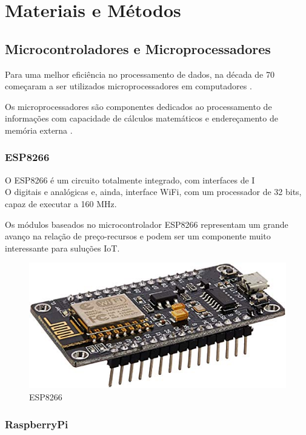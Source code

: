 \chapter{Materiais e Métodos}

\section{Microcontroladores e Microprocessadores}

Para uma melhor eficiência no processamento de dados, na década de 70
começaram a ser utilizados microprocessadores em computadores \cite{martins2005sistemas}. 

Os microprocessadores são componentes dedicados ao processamento de informações com
capacidade de cálculos matemáticos e endereçamento de memória externa \cite{chase2007sistemas}.

\subsection{ESP8266}

O ESP8266 é um circuito totalmente integrado, com interfaces de I\\O digitais e analógicas e, ainda, interface WiFi, com um processador de 32 bits, capaz de executar a 160 MHz.

Os módulos baseados no microcontrolador ESP8266 representam um grande avanço na relação de preço-recursos e podem ser um componente muito interessante para suluções IoT.\cite {de2017internet}

\begin{figure}[htbp]
		\centering
		\includegraphics[scale=0.5]{figuras/esp8266_.jpg}
		\caption{ESP8266}
		\label{fig:09}
\end{figure}

\subsection{RaspberryPi}

